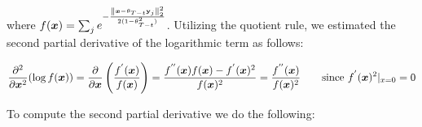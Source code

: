 where $f(\boldsymbol{x})=\sum_j e^{-\frac{{\left\lVert\boldsymbol{x} - \theta_{T - t}\mathbf{y}_j\right\rVert}_{2}^2}{2 ( 1 - \theta_{T-t}^2)}}$. Utilizing the quotient rule, we estimated the second partial derivative of the logarithmic term as follows:

\begin{equation*}
    \frac{\partial^2}{\partial \boldsymbol{x}^2} (\log f(\boldsymbol{x})) = \frac{\partial}{\partial \boldsymbol{x}} \left( \frac{f^{'}(\boldsymbol{x})}{f(\boldsymbol{x})}  \right)= \frac{f^{''}(\boldsymbol{x})f(\boldsymbol{x}) - f^{'}(\boldsymbol{x})^2}{f(\boldsymbol{x})^2}\\
    =\frac{f^{''}(\boldsymbol{x})}{f(\boldsymbol{x})^2} \quad\quad \text{since } f^{'}(\boldsymbol{x})^2|_{x=0}=0
\end{equation*}

To compute the second partial derivative we do the following:

